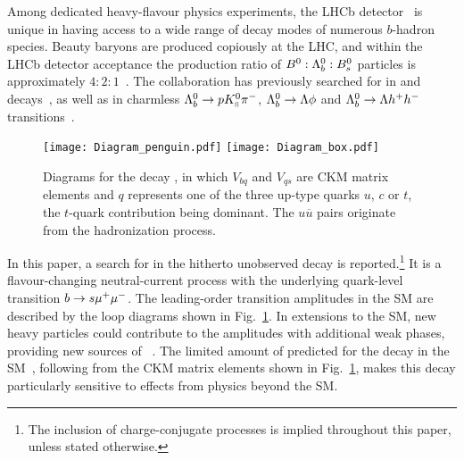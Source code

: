 Among dedicated heavy-flavour physics experiments, the LHCb detector~\cite{Alves:2008zz} is unique in having access to a wide range of decay modes of numerous $b$-hadron species. Beauty baryons are produced copiously at the LHC, and within the LHCb detector acceptance the production ratio of ${{B}^0}:{{\Lambda}^0_{b}}:{{B}^0_{s}}$ particles is approximately $4:2:1$~\cite{Aaij:2011jp}.
The \lhcb collaboration has previously searched for \CPV in \LpiJ and \LKJ decays~\cite{LHCb-PAPER-2014-020}, as well as in charmless ${{\Lambda}^0_{b}}\rightarrow p{{K}^0_{\mathrm{ \scriptscriptstyle S}}}\pi^-$, ${{\Lambda}^0_{b}}\rightarrow{\ensuremath{\Lambda}}\phi$ and ${{\Lambda}^0_{b}}\rightarrow{\ensuremath{\Lambda}} h^ +h^-$ transitions~\cite{LHCb-PAPER-2013-061,LHCb-PAPER-2016-002,LHCb-PAPER-2016-004}.
%
\begin{figure}[h]
\centering
\texttt{[image: Diagram\_penguin.pdf]}
\texttt{[image: Diagram\_box.pdf]}
\caption{Diagrams for the decay \LK, in which $V_{bq}$ and $V_{qs}$ are CKM matrix elements and $q$ represents one of the three up-type quarks $u$, $c$ or $t$, the $t$-quark contribution being dominant. The $u\overline{u}$ pairs originate from the hadronization process.\label{fey::LbpKmumu}}
\end{figure}
%

In this paper, a search for \CPV in the hitherto unobserved decay \LK is reported.\footnote{The inclusion of charge-conjugate processes is implied throughout this paper, unless stated otherwise.}
It is a flavour-changing neutral-current process with the underlying quark-level transition $b \rightarrow s {\mu^+} {\mu^-}$. The leading-order transition amplitudes in the SM are described by the loop diagrams shown in Fig.~\ref{fey::LbpKmumu}. In extensions to the SM, new heavy particles could contribute to the amplitudes with additional weak phases,
providing new sources of \CPV~\cite{Gauld:2013qja,Paracha:2014hca}. The limited amount of \CPV predicted for the decay \LK in the SM~\cite{Alok:2011gv,Paracha:2014hca}, following from the CKM matrix elements shown in Fig.~\ref{fey::LbpKmumu}, makes this decay particularly sensitive to \CPV effects from physics beyond the SM. 
